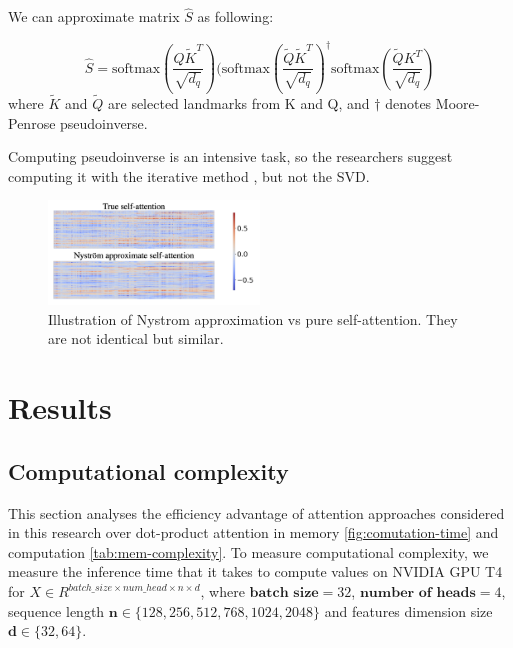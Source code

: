 
We can approximate matrix $\hat{S}$ as following:

$$\hat{S} = \text{softmax}(\frac{Q\tilde{K}^T}{\sqrt{d_q}}) (\text{softmax}(\frac{\tilde{Q}\tilde{K}^T}{\sqrt{d_q}})^{\dagger} \text{softmax}(\frac{\tilde{Q}{K}^T}{\sqrt{d_q}})$$
where $\tilde{K}$ and $\tilde{Q}$ are selected landmarks from K and Q, and $\dagger$ denotes Moore-Penrose pseudoinverse.  

Computing pseudoinverse is an intensive task, so the researchers suggest computing it with the iterative method \cite{pseudoiverse}, but not the SVD.

\begin{figure}[h]
\centering
\includegraphics[width=0.5\textwidth]{nystrom-approximation.png}
\caption{\label{fig:nystrom-approximation}Illustration of Nystrom approximation vs pure self-attention. They are not identical but similar.}
\end{figure}

\section{Results}

\subsection{Computational complexity}

This section analyses the efficiency advantage of attention approaches considered in this research over dot-product attention in memory \ref{fig:comutation-time} and computation \ref{tab:mem-complexity}. 
To measure computational complexity, we measure the inference time that it takes to compute values on NVIDIA GPU T4 for $ X \in R^{ batch\_size \times num\_head \times n \times d }$, where $\textbf{batch size}=32$, $\textbf{number of heads}=4$, sequence length $\textbf{n} \in \{128, 256, 512, 768, 1024, 2048\}$ and features dimension size $\textbf{d} \in \{32, 64\}$.


